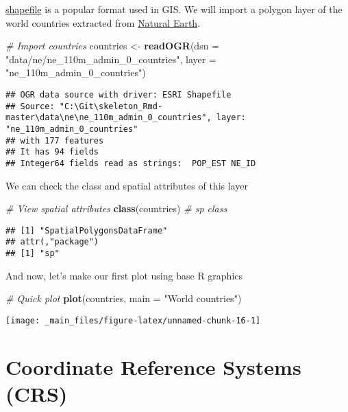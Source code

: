 \documentclass[]{book}
\newenvironment{Shaded}{\begin{snugshade}}{\end{snugshade}}
\newcommand{\CommentTok}[1]{\textcolor[rgb]{0.56,0.35,0.01}{\textit{#1}}}
\newcommand{\DataTypeTok}[1]{\textcolor[rgb]{0.13,0.29,0.53}{#1}}
\newcommand{\KeywordTok}[1]{\textcolor[rgb]{0.13,0.29,0.53}{\textbf{#1}}}
\newcommand{\NormalTok}[1]{#1}
\newcommand{\StringTok}[1]{\textcolor[rgb]{0.31,0.60,0.02}{#1}}
\begin{document}
\href{https://en.wikipedia.org/wiki/Shapefile}{shapefile} is a popular format used in GIS.
We will import a polygon layer of the world countries extracted from \href{https://www.naturalearthdata.com/}{Natural Earth}.

\begin{Shaded}
\begin{Highlighting}[]
\CommentTok{# Import countries}
\NormalTok{countries <-}\StringTok{ }\KeywordTok{readOGR}\NormalTok{(}\DataTypeTok{dsn =} \StringTok{"data/ne/ne_110m_admin_0_countries"}\NormalTok{, }\DataTypeTok{layer =} \StringTok{"ne_110m_admin_0_countries"}\NormalTok{)}
\end{Highlighting}
\end{Shaded}

\begin{verbatim}
## OGR data source with driver: ESRI Shapefile 
## Source: "C:\Git\skeleton_Rmd-master\data\ne\ne_110m_admin_0_countries", layer: "ne_110m_admin_0_countries"
## with 177 features
## It has 94 fields
## Integer64 fields read as strings:  POP_EST NE_ID
\end{verbatim}

We can check the class and spatial attributes of this layer

\begin{Shaded}
\begin{Highlighting}[]
\CommentTok{# View spatial attributes}
\KeywordTok{class}\NormalTok{(countries)  }\CommentTok{# sp class}
\end{Highlighting}
\end{Shaded}

\begin{verbatim}
## [1] "SpatialPolygonsDataFrame"
## attr(,"package")
## [1] "sp"
\end{verbatim}

And now, let's make our first plot using base R graphics

\begin{Shaded}
\begin{Highlighting}[]
\CommentTok{# Quick plot}
\KeywordTok{plot}\NormalTok{(countries, }\DataTypeTok{main =} \StringTok{"World countries"}\NormalTok{)}
\end{Highlighting}
\end{Shaded}

\begin{center}\texttt{[image: \_main\_files/figure-latex/unnamed-chunk-16-1]} \end{center}

\hypertarget{coordinate-reference-systems-crs}{%
\section{Coordinate Reference Systems (CRS)}\label{coordinate-reference-systems-crs}}
\end{document}
